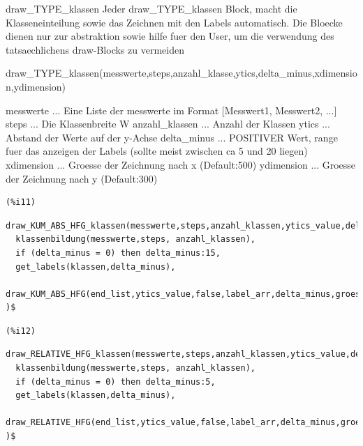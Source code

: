\documentclass[12pt]{article}
\begin{document}
draw\_TYPE\_klassen
    Jeder draw\_TYPE\_klassen Block, macht die Klasseneinteilung sowie das Zeichnen mit den Labels automatisch.
    Die Bloecke dienen nur zur abstraktion sowie hilfe fuer den User, um die verwendung des tatsaechlichens draw-Blocks zu vermeiden


draw\_TYPE\_klassen(messwerte,steps,anzahl\_klasse,ytics,delta\_minus,xdimension,ydimension)

messwerte       ... Eine Liste der messwerte im Format [Messwert1, Messwert2, ...]
steps           ... Die Klassenbreite W
anzahl\_klassen  ... Anzahl der Klassen
ytics           ... Abstand der Werte auf der y-Achse
delta\_minus     ... POSITIVER Wert, range fuer das anzeigen der Labels (sollte meist zwischen ca 5 und 20 liegen)
xdimension      ... Groesse der Zeichnung nach x (Default:500)
ydimension      ... Groesse der Zeichnung nach y (Default:300)

\noindent
\begin{minipage}[t]{8ex}{\color{red}\bf
\begin{verbatim}
(%i11) 
\end{verbatim}}
\end{minipage}
\begin{minipage}[t]{\textwidth}{\color{blue}
\begin{verbatim}
draw_KUM_ABS_HFG_klassen(messwerte,steps,anzahl_klassen,ytics_value,delta_minus,groesse1,groesse2):=block(
  klassenbildung(messwerte,steps, anzahl_klassen),
  if (delta_minus = 0) then delta_minus:15,
  get_labels(klassen,delta_minus),
  draw_KUM_ABS_HFG(end_list,ytics_value,false,label_arr,delta_minus,groesse1,groesse2)
)$
\end{verbatim}}
\end{minipage}


\noindent
\begin{minipage}[t]{8ex}{\color{red}\bf
\begin{verbatim}
(%i12) 
\end{verbatim}}
\end{minipage}
\begin{minipage}[t]{\textwidth}{\color{blue}
\begin{verbatim}
draw_RELATIVE_HFG_klassen(messwerte,steps,anzahl_klassen,ytics_value,delta_minus,groesse1,groesse2):=block(
  klassenbildung(messwerte,steps, anzahl_klassen),
  if (delta_minus = 0) then delta_minus:5,
  get_labels(klassen,delta_minus),
  draw_RELATIVE_HFG(end_list,ytics_value,false,label_arr,delta_minus,groesse1,groesse2)
)$
\end{verbatim}}
\end{minipage}
\end{document}
